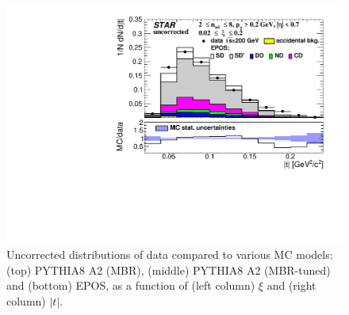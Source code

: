 \begin{figure}[H]
	\hfill
	\includegraphics[width=.49\textwidth,page=1]{chapters/chrgSTAR/img/nonSD/SDT_epos_xi0_RP_starsim_t.pdf}
	\caption{Uncorrected distributions of data compared to various MC models: (top) PYTHIA8 A2 (MBR), (middle) PYTHIA8 A2 (MBR-tuned) and (bottom) EPOS, as a function of (left column) $\xi$  and (right column) $|t|$.}
	\label{fig:nonSDxit}
\end{figure}
\newpage

